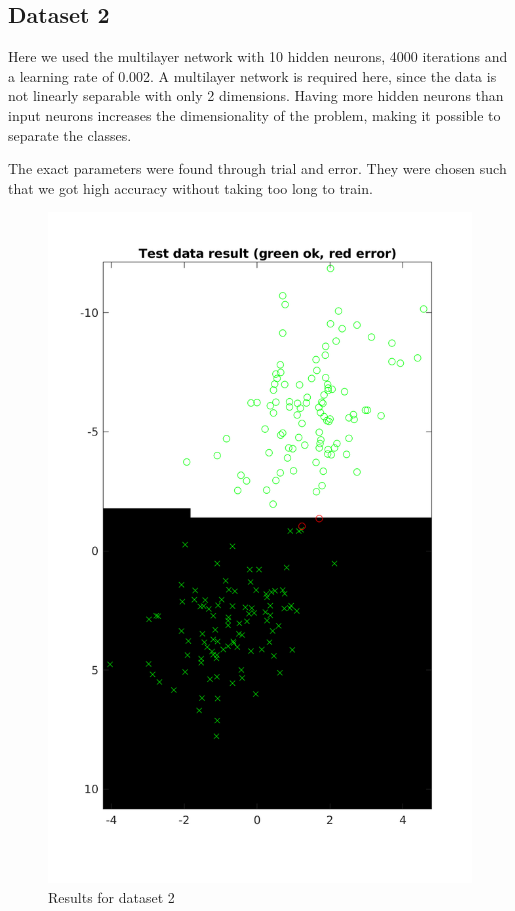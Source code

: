\documentclass{article}
\begin{document}
\subsection{Dataset 2}

Here we used the multilayer network with 10 hidden neurons, 4000 iterations and a
learning rate of 0.002. A multilayer network is required here, since the data
is not linearly separable with only 2 dimensions. Having more hidden neurons
than input neurons increases the dimensionality of the problem, making it
possible to separate the classes.

The exact parameters were found through trial and error. They were chosen such
that we got high accuracy without taking too long to train.

\begin{figure}
    \includegraphics[width=13cm]{dataset1res.png}
    \caption{Results for dataset 2}
    \label{fig:res1}
\end{figure}
\end{document}

